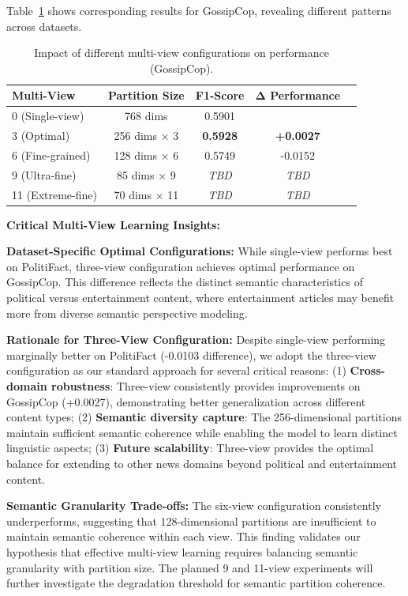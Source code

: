 Table~\ref{tab:hyperparameter_multi_view_gossipcop} shows corresponding results for GossipCop, revealing different patterns across datasets.

\begin{table}[htbp]
\centering
\caption{Impact of different multi-view configurations on performance (GossipCop).}
\label{tab:hyperparameter_multi_view_gossipcop}
\begin{tabular}{lcccc}
\toprule
\textbf{Multi-View} & \textbf{Partition Size} & \textbf{F1-Score} & \textbf{Δ Performance} \\
\midrule
0 (Single-view) & 768 dims & 0.5901 & \- \\
3 (Optimal) & 256 dims × 3 & \textbf{0.5928} & \textbf{+0.0027} \\
6 (Fine-grained) & 128 dims × 6 & 0.5749 & -0.0152 \\
9 (Ultra-fine) & 85 dims × 9 & \textit{TBD} & \textit{TBD} \\
11 (Extreme-fine) & 70 dims × 11 & \textit{TBD} & \textit{TBD} \\
\bottomrule
\end{tabular}
\end{table}

\textbf{Critical Multi-View Learning Insights:}

\textbf{Dataset-Specific Optimal Configurations:} While single-view performs best on PolitiFact, three-view configuration achieves optimal performance on GossipCop. This difference reflects the distinct semantic characteristics of political versus entertainment content, where entertainment articles may benefit more from diverse semantic perspective modeling.

\textbf{Rationale for Three-View Configuration:} Despite single-view performing marginally better on PolitiFact (-0.0103 difference), we adopt the three-view configuration as our standard approach for several critical reasons: (1) \textbf{Cross-domain robustness}: Three-view consistently provides improvements on GossipCop (+0.0027), demonstrating better generalization across different content types; (2) \textbf{Semantic diversity capture}: The 256-dimensional partitions maintain sufficient semantic coherence while enabling the model to learn distinct linguistic aspects; (3) \textbf{Future scalability}: Three-view provides the optimal balance for extending to other news domains beyond political and entertainment content.

\textbf{Semantic Granularity Trade-offs:} The six-view configuration consistently underperforms, suggesting that 128-dimensional partitions are insufficient to maintain semantic coherence within each view. This finding validates our hypothesis that effective multi-view learning requires balancing semantic granularity with partition size. The planned 9 and 11-view experiments will further investigate the degradation threshold for semantic partition coherence.

